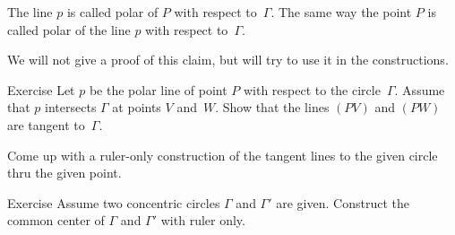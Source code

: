 The line $p$ is called polar of $P$ with respect to~$\Gamma$.
The same way the point $P$ is called polar of the line $p$ with respect to~$\Gamma$.

We will not give a proof of this claim, but will try to use it in the constructions.

\begin{thm}{Exercise}\label{ex:tangent ruler}
Let $p$ be the polar line of point $P$ with respect to the circle~$\Gamma$.
Assume that $p$ intersects $\Gamma$ at points $V$ and~$W$.
Show that the lines $(PV)$ and $(PW)$ are tangent to~$\Gamma$.

Come up with a ruler-only construction of the tangent lines to the given circle thru the given point.
\end{thm}

\begin{thm}{Exercise}\label{ex:concentric-circ}
Assume two concentric circles $\Gamma$ and $\Gamma'$ are given.
Construct the common center of $\Gamma$ and $\Gamma'$ with ruler only.
\end{thm}


